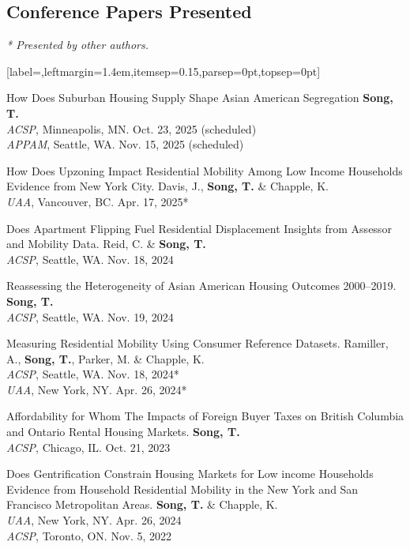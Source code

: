 \documentclass[11pt,letterpaper]{article}
\newcommand{\listitemspace}{0.25em}
\renewenvironment{itemize}
{\begin{list}{}{\setlength{\leftmargin}{1em}
\setlength{\parskip}{0pt}
\setlength{\itemsep}{\listitemspace}
\setlength{\parsep}{\listitemspace}}}
{\end{list}}
\newcommand{\term}[1]{(#1)}
\newenvironment{subpoints}{%
  \begin{itemize}[label={},leftmargin=1.4em,itemsep=0.15\baselineskip,parsep=0pt,topsep=0pt]}%
  {\end{itemize}}
\begin{document}
\subsection{Conference Papers Presented}
{\footnotesize\emph{* Presented by other authors.}}
\begin{subpoints}
  \item How Does Suburban Housing Supply Shape Asian American Segregation \textbf{Song, T.}
        \\[-0.15em]{\footnotesize \emph{ACSP}, Minneapolis, MN. Oct. 23, 2025 \term{scheduled}}
        \\[-0.15em]{\footnotesize \emph{APPAM}, Seattle, WA. Nov. 15, 2025 \term{scheduled}}

  \item How Does Upzoning Impact Residential Mobility Among Low Income Households Evidence from New York City. Davis, J., \textbf{Song, T.} \& Chapple, K.
        \\[-0.15em]{\footnotesize \emph{UAA}, Vancouver, BC. Apr. 17, 2025*}

  \item Does Apartment Flipping Fuel Residential Displacement Insights from Assessor and Mobility Data. Reid, C. \& \textbf{Song, T.}
        \\[-0.15em]{\footnotesize \emph{ACSP}, Seattle, WA. Nov. 18, 2024}

  \item Reassessing the Heterogeneity of Asian American Housing Outcomes 2000–2019. \textbf{Song, T.}
        \\[-0.15em]{\footnotesize \emph{ACSP}, Seattle, WA. Nov. 19, 2024}

  \item Measuring Residential Mobility Using Consumer Reference Datasets. Ramiller, A., \textbf{Song, T.}, Parker, M. \& Chapple, K.
        \\[-0.15em]{\footnotesize \emph{ACSP}, Seattle, WA. Nov. 18, 2024*}
        \\[-0.15em]{\footnotesize \emph{UAA}, New York, NY. Apr. 26, 2024*}

  \item Affordability for Whom The Impacts of Foreign Buyer Taxes on British Columbia and Ontario Rental Housing Markets. \textbf{Song, T.}
        \\[-0.15em]{\footnotesize \emph{ACSP}, Chicago, IL. Oct. 21, 2023}

  \item Does Gentrification Constrain Housing Markets for Low income Households Evidence from Household Residential Mobility in the New York and San Francisco Metropolitan Areas. \textbf{Song, T.} \& Chapple, K.
        \\[-0.15em]{\footnotesize \emph{UAA}, New York, NY. Apr. 26, 2024}
        \\[-0.15em]{\footnotesize \emph{ACSP}, Toronto, ON. Nov. 5, 2022}
\end{subpoints}
\end{document}
